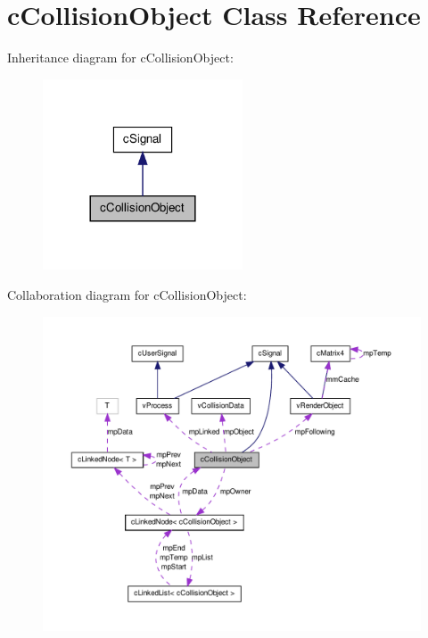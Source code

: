 \hypertarget{classc_collision_object}{
\section{cCollisionObject Class Reference}
\label{classc_collision_object}
}


Inheritance diagram for cCollisionObject:
\nopagebreak
\begin{figure}[H]
\begin{center}
\leavevmode
\includegraphics[width=168pt]{classc_collision_object__inherit__graph}
\end{center}
\end{figure}


Collaboration diagram for cCollisionObject:
\nopagebreak
\begin{figure}[H]
\begin{center}
\leavevmode
\includegraphics[width=400pt]{classc_collision_object__coll__graph}
\end{center}
\end{figure}
